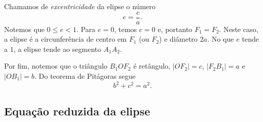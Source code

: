 Chamamos de \emph{excentricidade} da elipse o número
\begin{equation}
  e = \frac{c}{a}.
\end{equation}
Notemos que $0 \leq e < 1$. Para $e=0$, temos $c=0$ e, portanto $F_1=F_2$. Neste caso, a elipse é a circunferência de centro em $F_1$ (ou $F_2$) e diâmetro $2a$. No que $e$ tende a $1$, a elipse tende ao segmento $A_1A_2$.

Por fim, notemos que o triângulo $B_1OF_2$ é retângulo, $|OF_2|=c$, $|F_2B_1|=a$ e $|OB_1|=b$. Do teorema de Pitágoras segue
\begin{equation}\label{eq:elipse_obs}
  b^2 + c^2 = a^2.
\end{equation}

\subsection{Equação reduzida da elipse}

